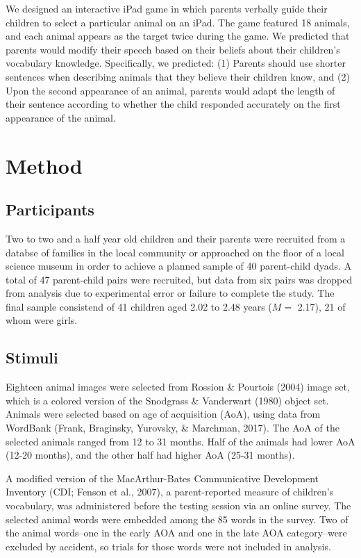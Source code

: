 \documentclass[10pt, letterpaper]{article}
\begin{document}
We designed an interactive iPad game in which parents verbally guide
their children to select a particular animal on an iPad. The game
featured 18 animals, and each animal appears as the target twice during
the game. We predicted that parents would modify their speech based on
their beliefs about their children's vocabulary knowledge. Specifically,
we predicted: (1) Parents should use shorter sentences when describing
animals that they believe their children know, and (2) Upon the second
appearance of an animal, parents would adapt the length of their
sentence according to whether the child responded accurately on the
first appearance of the animal.

\section{Method}\label{method}

\subsection{Participants}\label{participants}

Two to two and a half year old children and their parents were recruited
from a databse of families in the local community or approached on the
floor of a local science museum in order to achieve a planned sample of
40 parent-child dyads. A total of 47 parent-child pairs were recruited,
but data from six pairs was dropped from analysis due to experimental
error or failure to complete the study. The final sample consistend of
41 children aged 2.02 to 2.48 years (\(M =\) 2.17), 21 of whom were
girls.

\subsection{Stimuli}\label{stimuli}

Eighteen animal images were selected from Rossion \& Pourtois (2004)
image set, which is a colored version of the Snodgrass \& Vanderwart
(1980) object set. Animals were selected based on age of acquisition
(AoA), using data from WordBank (Frank, Braginsky, Yurovsky, \&
Marchman, 2017). The AoA of the selected animals ranged from 12 to 31
months. Half of the animals had lower AoA (12-20 months), and the other
half had higher AoA (25-31 months).

A modified version of the MacArthur-Bates Communicative Development
Inventory (CDI; Fenson et al., 2007), a parent-reported measure of
children's vocabulary, was administered before the testing session via
an online survey. The selected animal words were embedded among the 85
words in the survey. Two of the animal words--one in the early AOA and
one in the late AOA category--were excluded by accident, so trials for
those words were not included in analysis.
\end{document}
